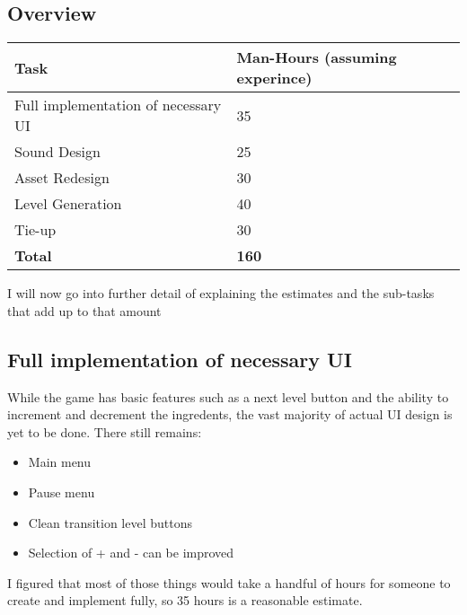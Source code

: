 \documentclass{article}
\begin{document}
\subsection{Overview}

\begin{table}[h]
\begin{tabular}{l|l}
\textbf{Task}                       & \textbf{Man-Hours (assuming experince)} \\ \hline
Full implementation of necessary UI & 35                                                 \\ \hline
Sound Design                        & 25                                                 \\ \hline
Asset Redesign                      & 30                                              \\ \hline
Level Generation                    & 40                                                 \\ \hline
Tie-up                              & 30                                               \\ \hline
\textbf{Total}                      & \textbf{160}                                              \\ 
\end{tabular}
\end{table}

I will now go into further detail of explaining the estimates and the
sub-tasks that add up to that amount

\subsection{Full implementation of necessary UI}

While the game has basic features such as a next level button and the
ability to increment and decrement the ingredents, the vast majority
of actual UI design is yet to be done. There still remains:

\begin{itemize}
  \item Main menu
  \item Pause menu
  \item Clean transition level buttons
  \item Selection of + and - can be improved
\end{itemize}

I figured that most of those things would take a handful of hours for
someone to create and implement fully, so 35 hours is a reasonable
estimate.
\end{document}
